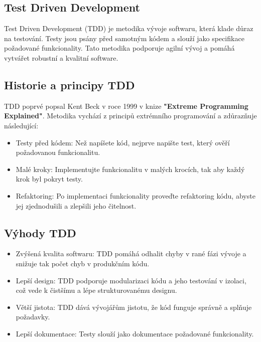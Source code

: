 \documentclass{article}
\begin{document}
    \begin{Test Driven Development}
        \section{Test Driven Development}\label{sec:test-driven-development}

        Test Driven Development (TDD) je metodika vývoje softwaru, která klade důraz na testování.
        Testy jsou psány před samotným kódem a slouží jako specifikace požadované funkcionality.
        Tato metodika podporuje agilní vývoj a pomáhá vytvářet robustní a kvalitní software.

        \subsection{Historie a principy TDD}\label{subsec:historie-a-principy-tdd}

        TDD poprvé popsal Kent Beck v roce 1999 v knize \textbf{"Extreme Programming Explained"}.
        Metodika vychází z principů extrémního programování a zdůrazňuje následující:

        \begin{itemize}
            \item Testy před kódem: Než napíšete kód, nejprve napište test, který ověří požadovanou funkcionalitu.
            \item Malé kroky: Implementujte funkcionalitu v malých krocích, tak aby každý krok byl pokryt testy.
            \item Refaktoring: Po implementaci funkcionality proveďte refaktoring kódu, abyste jej zjednodušili a zlepšili jeho čitelnost.
        \end{itemize}

        \subsection{Výhody TDD}\label{subsec:vyhody-tdd}

        \begin{itemize}
            \item Zvýšená kvalita softwaru: TDD pomáhá odhalit chyby v rané fázi vývoje a snižuje tak počet chyb v produkčním kódu.
            \item Lepší design: TDD podporuje modularizaci kódu a jeho testování v izolaci, což vede k čistšímu a lépe strukturovanému designu.
            \item Větší jistota: TDD dává vývojářům jistotu, že kód funguje správně a splňuje požadavky.
            \item Lepší dokumentace: Testy slouží jako dokumentace požadované funkcionality.
        \end{itemize}


\end{Test Driven Development}
\end{document}
